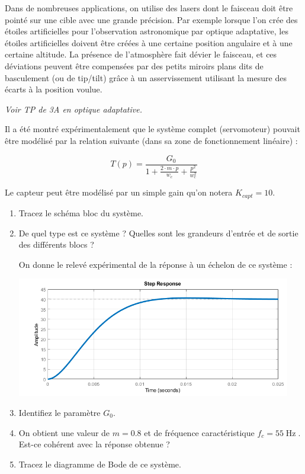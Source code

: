 Dans de nombreuses applications, on utilise des lasers dont le faisceau doit être pointé sur une cible avec une grande précision. Par exemple lorsque l'on crée des étoiles artificielles pour l'observation astronomique par optique adaptative, les étoiles artificielles doivent être créées à une certaine position angulaire et à une certaine altitude. La présence de l'atmosphère fait dévier le faisceau, et ces déviations peuvent être compensées par des petits miroirs plans dits de basculement (ou de tip/tilt) grâce à un asservissement utilisant la mesure des écarts à la position voulue.

\textit{Voir TP de 3A en optique adaptative.}



Il a été montré expérimentalement que le système complet (servomoteur) pouvait être modélisé par la relation suivante (dans sa zone de fonctionnement linéaire) :

$$T(p) = \frac{G_0}{1 + \frac{2 \cdot m \cdot p}{w_c} + \frac{p^2}{w_c^2}}$$

Le capteur peut être modélisé par un simple gain qu'on notera $K_{capt} = 10$.

\begin{enumerate}
	\item Tracez le schéma bloc du système.
	\item De quel type est ce système ? Quelles sont les grandeurs d'entrée et de sortie des différents blocs ?
	
	\medskip
	
	On donne le relevé expérimental de la réponse à un échelon de ce système :
	
\begin{center}
	\includegraphics[width=12cm]{images/TD/step_BO.png}
\end{center}
	
	\item Identifiez le paramètre $G_0$.
	\item On obtient une valeur de $m = 0.8$ et de fréquence caractéristique $f_c = 55\operatorname{Hz}$. Est-ce cohérent avec la réponse obtenue ?
	\item Tracez le diagramme de Bode de ce système.
\end{enumerate}

